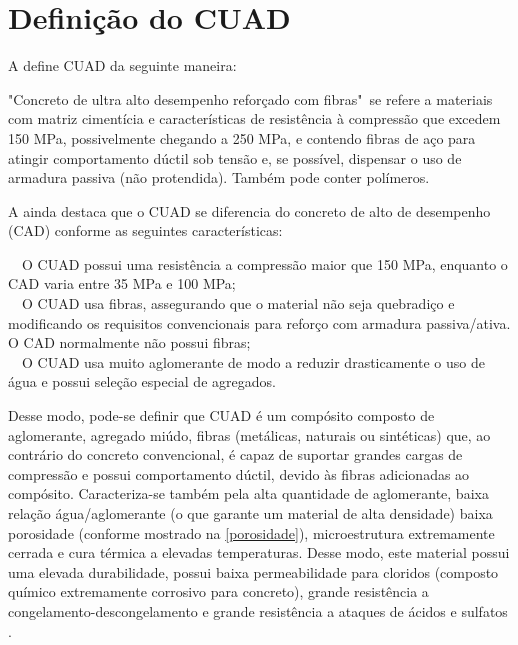 \section{Definição do CUAD}

A  define CUAD da seguinte maneira:

\begin{citacao}
"Concreto de ultra alto desempenho reforçado com fibras"~se refere a materiais com matriz cimentícia e características de resistência à compressão que excedem 150 MPa, possivelmente chegando a 250 MPa, e contendo fibras de aço para atingir comportamento dúctil sob tensão e, se possível, dispensar o uso de armadura passiva (não protendida). Também pode conter polímeros.
\end{citacao}


A  ainda destaca que o CUAD se diferencia do concreto de alto de desempenho (CAD) conforme as seguintes características:

\begin{citacao}
\textbullet~~O CUAD possui uma resistência a compressão maior que 150 MPa, enquanto o CAD varia entre 35 MPa e 100 MPa; \\ 
\textbullet~~O CUAD usa fibras, assegurando que o material não seja quebradiço e modificando os requisitos convencionais para reforço com armadura passiva/ativa. O CAD normalmente não possui fibras; \\
\textbullet~~O CUAD usa muito aglomerante de modo a reduzir drasticamente o uso de água e possui seleção especial de agregados.
\end{citacao}

Desse modo, pode-se definir que CUAD é um compósito composto de aglomerante, agregado miúdo, fibras (metálicas, naturais ou sintéticas) que, ao contrário do concreto convencional, é capaz de suportar grandes cargas de compressão e possui comportamento dúctil, devido às fibras adicionadas ao compósito. Caracteriza-se também pela alta quantidade de aglomerante, baixa relação água/aglomerante (o que garante um material de alta densidade) baixa porosidade (conforme mostrado na \autoref{porosidade}), microestrutura extremamente cerrada e cura térmica a elevadas temperaturas. Desse modo, este material possui uma elevada durabilidade, possui baixa permeabilidade para cloridos (composto químico extremamente corrosivo para concreto), grande resistência a congelamento-descongelamento e grande resistência a ataques de ácidos e sulfatos \cite[p.~7-11]{Resplendino}.

